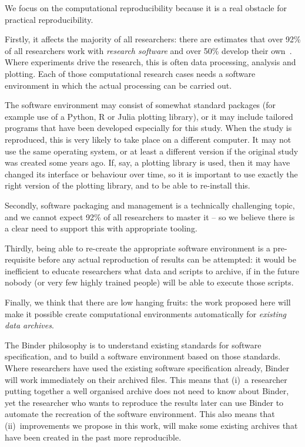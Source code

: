We focus on the computational reproducibility because it is a real
obstacle for practical reproducibility. 

Firstly, it affects the majority of all researchers: there are estimates that over 92\%
of all researchers work with \emph{research software} and over 50\% develop
their own~\cite{Hettrick2014}. Where experiments drive the research, this is
often data processing, analysis and plotting. Each of those computational
research cases needs a software environment in which the actual processing can
be carried out.

The software environment may consist of somewhat standard packages (for example
use of a Python, R or Julia plotting library), or it may include tailored
programs that have been developed especially for this study. When the study is
reproduced, this is very likely to take place on a different computer. It may
not use the same operating system, or at least a different version if the
original study was created some years ago. If, say, a plotting library is used,
then it may have changed its interface or behaviour over time, so it is
important to use exactly the right version of the plotting library, and to be
able to re-install this.

Secondly, software packaging and management is a technically challenging topic,
and we cannot expect 92\% of all researchers to master it -- so we believe there
is a clear need to support this with appropriate tooling.

Thirdly, being able to re-create the appropriate software environment is a
pre-requisite before any actual reproduction of results can be attempted: it
would be inefficient to educate researchers what data and scripts to archive, if
in the future nobody (or very few highly trained people) will be able to execute
those scripts.

Finally, we think that there are low hanging fruits: the work proposed here will
make it possible create computational environments automatically for
\emph{existing data archives}.

The Binder philosophy is to understand existing standards for software
specification, and to build a software environment based on those standards.
Where researchers have used the existing software specification already, Binder
will work immediately on their archived files. This means that (i)~a researcher
putting together a well organised archive does not need to know about Binder,
yet the researcher who wants to reproduce the results later can use Binder to
automate the recreation of the software environment. This also means that
(ii)~improvements we propose in this work, will make some existing archives that
have been created in the past more reproducible.

